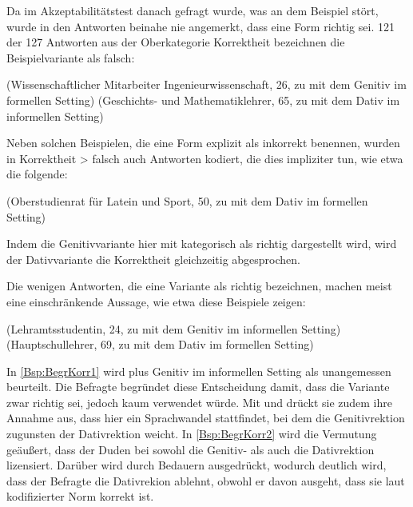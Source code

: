 Da im Akzeptabilitätstest danach gefragt wurde, was an dem Beispiel stört, wurde in den Antworten beinahe nie angemerkt, dass eine Form richtig sei. 
121 der 127 Antworten aus der Oberkategorie \glqq Korrektheit\grqq{} bezeichnen die Beispielvariante als falsch: 
\begin{exe}
\ex {} (Wissenschaftlicher Mitarbeiter Ingenieurwissenschaft, 26, zu \gegenueber{} mit dem Genitiv im formellen Setting) 
\ex {} (Geschichts- und Mathematiklehrer, 65, zu \waehrend{} mit dem Dativ im informellen Setting) 
\end{exe}
Neben solchen Beispielen, die eine Form explizit als inkorrekt benennen, wurden in \glqq Korrektheit > falsch\grqq{} auch Antworten kodiert, die dies impliziter tun, wie etwa die folgende:
\begin{exe}
\ex {} (Oberstudienrat für Latein und Sport, 50, zu \waehrend{} mit dem Dativ im formellen Setting) 
\end{exe}
Indem die Genitivvariante hier mit  kategorisch als richtig dargestellt wird, wird der Dativvariante die Korrektheit gleichzeitig abgesprochen. 

Die wenigen Antworten, die eine Variante als richtig bezeichnen, machen meist eine einschränkende Aussage, wie etwa diese Beispiele zeigen: 
\begin{exe}
\ex {} (Lehramtsstudentin, 24, zu \dank{} mit dem Genitiv im informellen Setting) \label{Bsp:BegrKorr1}
\ex {} (Hauptschullehrer, 69, zu \wegen{} mit dem Dativ im formellen Setting) \label{Bsp:BegrKorr2}
\end{exe}
In \autoref{Bsp:BegrKorr1} wird \dank{} plus Genitiv im informellen Setting als unangemessen beurteilt. 
Die Befragte begründet diese Entscheidung damit, dass die Variante zwar richtig sei, jedoch kaum verwendet würde. 
Mit  und  drückt sie zudem ihre Annahme aus, dass hier ein Sprachwandel stattfindet, bei dem die Genitivrektion zugunsten der Dativrektion weicht. 
In \autoref{Bsp:BegrKorr2} wird die Vermutung geäußert, dass der Duden bei \wegen{} sowohl die Genitiv- als auch die Dativrektion lizensiert. 
Darüber wird durch  Bedauern ausgedrückt, wodurch deutlich wird, dass der Befragte die Dativrekion ablehnt, obwohl er davon ausgeht, dass sie laut kodifizierter Norm korrekt ist. 

